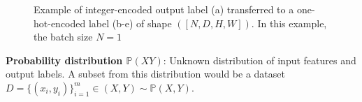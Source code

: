 \begin{figure}[H]
    \caption[Integer encoding $\to$ one-hot-encoding]{Example of integer-encoded output label (a) transferred to a one-hot-encoded label (b-e) of shape $([N,D,H,W])$. In this example, the batch size $N=1$}
    \label{one_hot_encoded_mask}
\end{figure}

\textbf{Probability distribution $\mathbb{P}(XY)$}: Unknown distribution of input features and output labels. A subset from this distribution would be a dataset $D=\{(x_i,y_i)\}_{i=1}^m \in (X,Y) \sim \mathbb{P}(X,Y)$.

